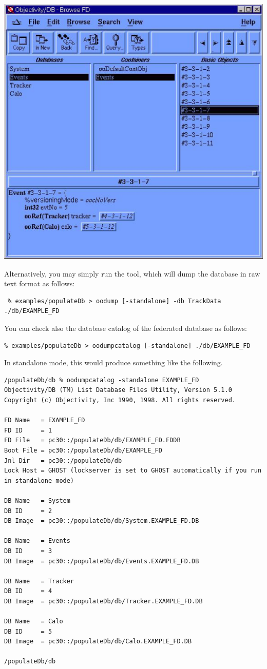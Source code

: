 \includegraphics[width=.7\linewidth, scale=.5]{ootoolmgr}

\par

Alternatively, you may
simply run the  tool, which will dump the database in raw text format
as follows: 

\begin{verbatim}
 % examples/populateDb > oodump [-standalone] -db TrackData ./db/EXAMPLE_FD 
\end{verbatim}

\par

You can check also the database catalog of the  federated database as follows:
\begin{verbatim}
% examples/populateDb > oodumpcatalog [-standalone] ./db/EXAMPLE_FD 
\end{verbatim}

\par

In standalone mode, this would produce something like the following.
\begin{verbatim}
/populateDb/db % oodumpcatalog -standalone EXAMPLE_FD 
Objectivity/DB (TM) List Database Files Utility, Version 5.1.0 
Copyright (c) Objectivity, Inc 1990, 1998. All rights reserved. 

FD Name   = EXAMPLE_FD 
FD ID     = 1 
FD File   = pc30::/populateDb/db/EXAMPLE_FD.FDDB 
Boot File = pc30::/populateDb/db/EXAMPLE_FD 
Jnl Dir   = pc30::/populateDb/db 
Lock Host = GHOST (lockserver is set to GHOST automatically if you run in standalone mode) 

DB Name   = System 
DB ID     = 2 
DB Image  = pc30::/populateDb/db/System.EXAMPLE_FD.DB 

DB Name   = Events 
DB ID     = 3 
DB Image  = pc30::/populateDb/db/Events.EXAMPLE_FD.DB 

DB Name   = Tracker 
DB ID     = 4 
DB Image  = pc30::/populateDb/db/Tracker.EXAMPLE_FD.DB 

DB Name   = Calo 
DB ID     = 5 
DB Image  = pc30::/populateDb/db/Calo.EXAMPLE_FD.DB 

/populateDb/db

\end{verbatim}
